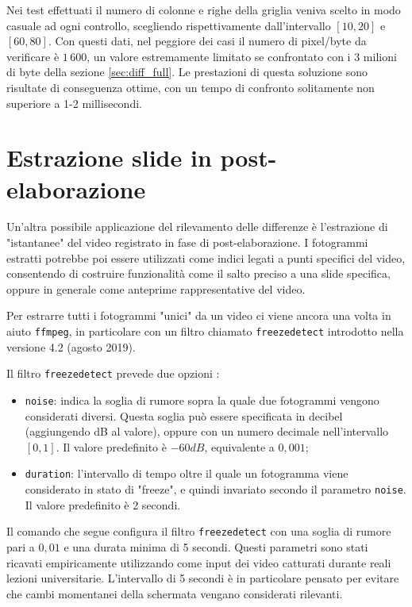 Nei test effettuati il numero di colonne e righe della griglia veniva scelto in modo casuale ad ogni controllo, scegliendo rispettivamente dall'intervallo $[10, 20]$ e $[60, 80]$. Con questi dati, nel peggiore dei casi il numero di pixel/byte da verificare è $1\,600$, un valore estremamente limitato se confrontato con i 3 milioni di byte della sezione \ref{sec:diff_full}. Le prestazioni di questa soluzione sono risultate di conseguenza ottime, con un tempo di confronto solitamente non superiore a 1-2 millisecondi.

\section{Estrazione slide in post-elaborazione}
\label{sec:diff_postprod}

Un'altra possibile applicazione del rilevamento delle differenze è l'estrazione di "istantanee" del video registrato in fase di post-elaborazione. I fotogrammi estratti potrebbe poi essere utilizzati come indici legati a punti specifici del video, consentendo di costruire funzionalità come il salto preciso a una slide specifica, oppure in generale come anteprime rappresentative del video.

Per estrarre tutti i fotogrammi "unici" da un video ci viene ancora una volta in aiuto \texttt{ffmpeg}, in particolare con un filtro chiamato \texttt{freezedetect} introdotto nella versione 4.2 (agosto 2019).

Il filtro \texttt{freezedetect} prevede due opzioni \cite{ffmpeg}:

\begin{itemize}
	\item \texttt{noise}: indica la soglia di rumore sopra la quale due fotogrammi vengono considerati diversi. Questa soglia può essere specificata in decibel (aggiungendo dB al valore), oppure con un numero decimale nell'intervallo $[0, 1]$. Il valore predefinito è $-60 dB$, equivalente a $0,001$;
	\item \texttt{duration}: l'intervallo di tempo oltre il quale un fotogramma viene considerato in stato di "freeze", e quindi invariato secondo il parametro \texttt{noise}. Il valore predefinito è 2 secondi.
\end{itemize}

Il comando che segue configura il filtro \texttt{freezedetect} con una soglia di rumore pari a $0,01$ e una durata minima di 5 secondi. Questi parametri sono stati ricavati empiricamente utilizzando come input dei video catturati durante reali lezioni universitarie. L'intervallo di 5 secondi è in particolare pensato per evitare che cambi momentanei della schermata vengano considerati rilevanti.

